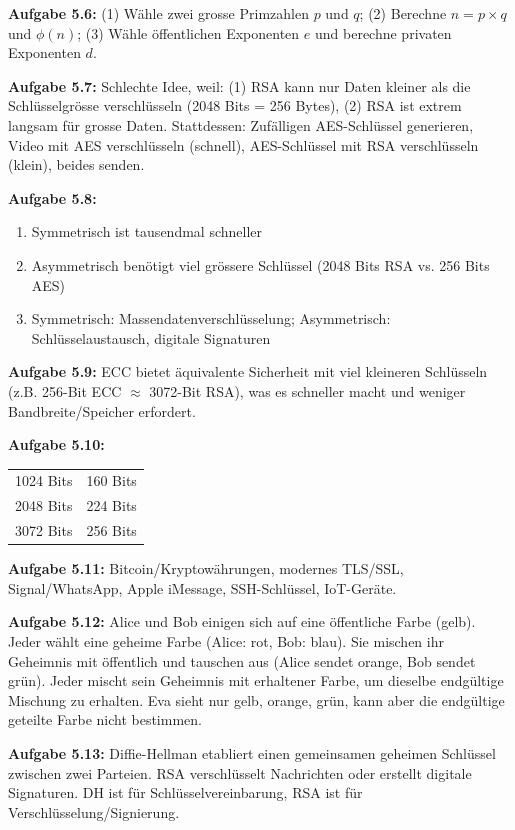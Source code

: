 \documentclass[11pt,a4paper]{report}
\begin{document}
\textbf{Aufgabe 5.6:}
(1) Wähle zwei grosse Primzahlen $p$ und $q$; (2) Berechne $n = p \times q$ und $\phi(n)$; (3) Wähle öffentlichen Exponenten $e$ und berechne privaten Exponenten $d$.

\textbf{Aufgabe 5.7:}
Schlechte Idee, weil: (1) RSA kann nur Daten kleiner als die Schlüsselgrösse verschlüsseln (2048 Bits = 256 Bytes), (2) RSA ist extrem langsam für grosse Daten. Stattdessen: Zufälligen AES-Schlüssel generieren, Video mit AES verschlüsseln (schnell), AES-Schlüssel mit RSA verschlüsseln (klein), beides senden.

\textbf{Aufgabe 5.8:}
\begin{enumerate}[label=\alph*)]
    \item Symmetrisch ist tausendmal schneller
    \item Asymmetrisch benötigt viel grössere Schlüssel (2048 Bits RSA vs. 256 Bits AES)
    \item Symmetrisch: Massendatenverschlüsselung; Asymmetrisch: Schlüsselaustausch, digitale Signaturen
\end{enumerate}

\textbf{Aufgabe 5.9:}
ECC bietet äquivalente Sicherheit mit viel kleineren Schlüsseln (z.B. 256-Bit ECC $\approx$ 3072-Bit RSA), was es schneller macht und weniger Bandbreite/Speicher erfordert.

\textbf{Aufgabe 5.10:}
\begin{center}
\begin{tabular}{|c|c|}
\hline
1024 Bits & 160 Bits \\
2048 Bits & 224 Bits \\
3072 Bits & 256 Bits \\
\hline
\end{tabular}
\end{center}

\textbf{Aufgabe 5.11:}
Bitcoin/Kryptowährungen, modernes TLS/SSL, Signal/WhatsApp, Apple iMessage, SSH-Schlüssel, IoT-Geräte.

\textbf{Aufgabe 5.12:}
Alice und Bob einigen sich auf eine öffentliche Farbe (gelb). Jeder wählt eine geheime Farbe (Alice: rot, Bob: blau). Sie mischen ihr Geheimnis mit öffentlich und tauschen aus (Alice sendet orange, Bob sendet grün). Jeder mischt sein Geheimnis mit erhaltener Farbe, um dieselbe endgültige Mischung zu erhalten. Eva sieht nur gelb, orange, grün, kann aber die endgültige geteilte Farbe nicht bestimmen.

\textbf{Aufgabe 5.13:}
Diffie-Hellman etabliert einen gemeinsamen geheimen Schlüssel zwischen zwei Parteien. RSA verschlüsselt Nachrichten oder erstellt digitale Signaturen. DH ist für Schlüsselvereinbarung, RSA ist für Verschlüsselung/Signierung.
\end{document}
